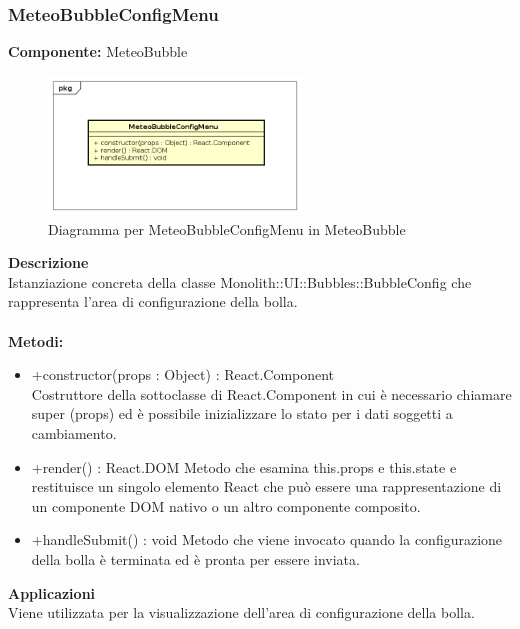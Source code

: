 \subsubsection{MeteoBubbleConfigMenu}
\textbf{Componente:}  MeteoBubble\\
   \FloatBarrier
   \begin{figure}[ht]
   \centering
   \includegraphics[width=0.6\textwidth]{img/single-MeteoBubbleConfigMenu}
   \caption{{Diagramma per MeteoBubbleConfigMenu in MeteoBubble}}
\end{figure}
\FloatBarrier
\textbf{Descrizione}\\
Istanziazione concreta della classe Monolith::UI::Bubbles::BubbleConfig che rappresenta l'area di configurazione della bolla. 
\\
\\
\textbf{Metodi:} 
\begin{itemize}
\item +constructor(props : Object) : React.Component 
\\
Costruttore della sottoclasse di React.Component in cui è necessario chiamare super (props) ed è possibile inizializzare lo stato per i dati soggetti a cambiamento.

\item +render() : React.DOM
Metodo che esamina this.props e this.state e restituisce un singolo elemento React che può essere una rappresentazione di un componente DOM nativo o un altro componente composito.

\item +handleSubmit() : void
Metodo che viene invocato quando la configurazione della bolla è terminata ed è pronta per essere inviata.

\end{itemize} 


\textbf{Applicazioni}\\
Viene utilizzata per la visualizzazione dell'area di configurazione della bolla. 


\clearpage

